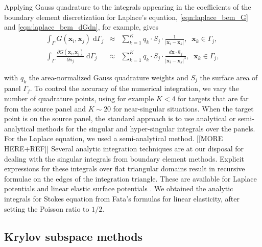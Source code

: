 \documentclass[final,leqno,]{siamltex1213}
\newcommand{\di}[1]{\text{d}#1}
\newcommand{\partiald}[2]{\frac{\partial #1}{\partial #2}}
\newcommand{\nhat}{\hat{n}}
\newcommand{\vect}[1]{\mathbf{#1}}
\begin{document}
Applying Gauss quadrature to the integrals appearing in the coefficients of the boundary element discretization for Laplace's equation, \eqref{eqn:laplace_bem_G} and \eqref{eqn:laplace_bem_dGdn}, for example, gives
%
\begin{eqnarray}
	\label{eqn:gauss:1st-kind}
	\int_{\Gamma} G(\vect{x}_i,\vect{x}_j)\;\di{\Gamma_j} & \approx & \sum_{k=1}^{K} q_k\cdot S_j\cdot \frac{1}{|\vect{x}_i-\vect{x}_k|},\;\;\vect{x}_k \in \Gamma_j, \\ 
	\label{eqn:gauss:2nd-kind}
	\int_{\Gamma} \partiald{G(\vect{x}_i,\vect{x}_j)}{\nhat_j}\;\di{\Gamma_j} & \approx & \sum_{k=1}^{K}q_k\cdot S_j\cdot \frac{d\vect{x}\cdot\nhat_j}{|\vect{x}_i-\vect{x}_k|^{3}},\;\;\vect{x}_k \in \Gamma_j,
\end{eqnarray}

\noindent
with $q_k$ the area-normalized Gauss quadrature weights and $S_j$ the surface area of panel $\Gamma_j$. To control the accuracy of the numerical integration, we vary the number of quadrature points, using for example $K< 4$ for targets that are far from the source panel and $K\sim 20$ for near-singular situations. 
When the target point is on the source panel, the standard approach is to use analytical or semi-analytical methods for the singular and hyper-singular integrals over the panels.
For the Laplace equation, we used a semi-analytical method. 
[[MORE HERE+REF]]
Several analytic integration techniques are at our disposal for dealing with the singular integrals from boundary element methods. Explicit expressions for these integrals over flat triangular domains result in recursive formulae on the edges of the integration triangle. These are available for Laplace potentials \cite{Fata2009} and linear elastic surface potentials \cite{Fata2011}. 
We obtained the analytic integrals for Stokes equation from Fata's formulas for linear elasticity, after setting the Poisson ratio to $1/2$. 

\subsection{Krylov subspace methods}
\end{document}
